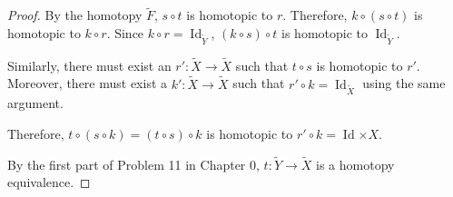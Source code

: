 \documentclass[12pt, psamsfonts]{amsart}
\theoremstyle{definition}
\theoremstyle{remark}
\DeclareMathOperator{\Id}{Id}
\numberwithin{equation}{section}
\begin{document}
\begin{proof}
  By the homotopy $\tilde{F}$, $s \circ t$ is homotopic to $r$.
  Therefore, $k \circ (s \circ t)$ is homotopic to $k \circ r$.
  Since $k \circ r = \Id_{\tilde{Y}}$, $(k \circ s) \circ t$ is homotopic to $\Id_{\tilde{Y}}$.

  Similarly, there must exist an $r': \tilde{X} \rightarrow \tilde{X}$ such that $t \circ s$ is homotopic to $r'$.
  Moreover, there must exist a $k': \tilde{X} \rightarrow \tilde{X}$ such that $r' \circ k = \Id_{\tilde{X}}$ using the same argument.

  Therefore, $t \circ (s \circ k) = (t \circ s) \circ k$ is homotopic to $r' \circ k = \Id{\times{X}}$.

  By the first part of Problem 11 in Chapter 0, $t: \tilde{Y} \rightarrow \tilde{X}$ is a homotopy equivalence.
\end{proof}
\end{document}

